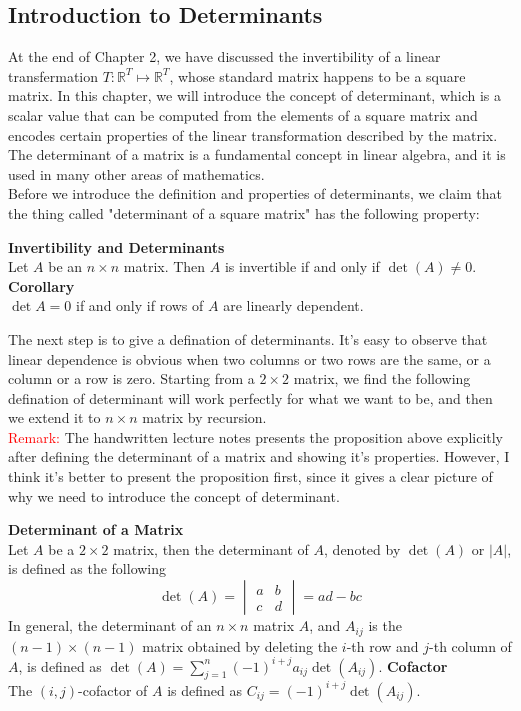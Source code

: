 \documentclass[10pt, a4paper]{article}
\newcommand{\R}{\mathbb{R}}
\begin{document}
\subsection{Introduction to Determinants}
At the end of Chapter 2, we have discussed the invertibility of a linear transfermation $T:\R^T\mapsto\R^T$, whose standard matrix happens to be a square matrix. In this chapter, we will introduce the concept of determinant, which is a scalar value that can be computed from the elements of a square matrix and encodes certain properties of the linear transformation described by the matrix. The determinant of a matrix is a fundamental concept in linear algebra, and it is used in many other areas of mathematics.\\
Before we introduce the definition and properties of determinants, we claim that the thing called "determinant of a square matrix" has the following property:
\begin{proposition}
    \textbf{Invertibility and Determinants} \\
    Let $A$ be an $n\times n$ matrix. Then $A$ is invertible if and only if $\det(A)\neq 0$.\\
    \textbf{Corollary} \\
    $\operatorname{det}A=0$ if and only if rows of $A$ are linearly dependent.
\end{proposition}
The next step is to give a defination of determinants. It's easy to observe that linear dependence is obvious when two  columns or two rows are the same, or a column or a row is zero.
Starting from a $2\times 2$ matrix, we find the following defination of determinant will work perfectly for what we want to be, and then we extend it to $n\times n$ matrix by recursion. \\
\indent\textcolor{red}{Remark:} The handwritten lecture notes presents the proposition above explicitly after defining the determinant of a matrix and showing it's properties. However, I think it's better to present the proposition first, since it gives a clear picture of why we need to introduce the concept of determinant. \\
\begin{definition}
    \textbf{Determinant of a Matrix}\\
    Let $A$ be a $2\times 2$ matrix, then the determinant of $A$, denoted by $\det(A)$ or $|A|$, is defined as the following $$\det(A) = \begin{vmatrix} a & b \\ c & d \end{vmatrix} = ad - bc$$
    In general, the determinant of an $n\times n$ matrix $A$, and $A_{ij}$ is the $(n-1)\times (n-1)$ matrix obtained by deleting the $i$-th row and $j$-th column of $A$, is defined as $\det(A) = \sum_{j=1}^n (-1)^{i+j}a_{ij}\det(A_{ij}).$
    \textbf{Cofactor}\\
    The $(i,j)$-cofactor of $A$ is defined as $C_{ij} = (-1)^{i+j}\det(A_{ij})$.\\
\end{definition}
\end{document}

